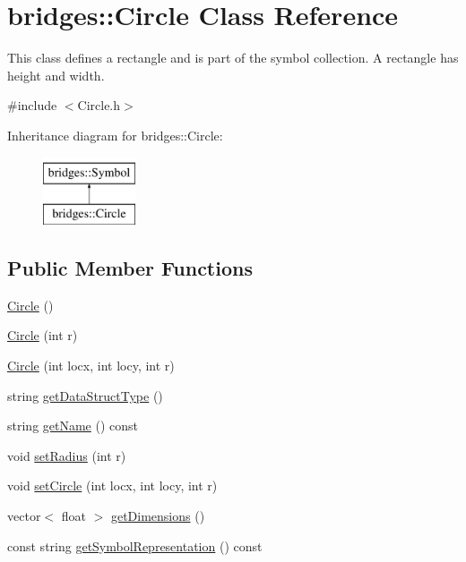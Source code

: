 \hypertarget{classbridges_1_1_circle}{}\section{bridges\+:\+:Circle Class Reference}
\label{classbridges_1_1_circle}


This class defines a rectangle and is part of the symbol collection. A rectangle has height and width.  




{\ttfamily \#include $<$Circle.\+h$>$}

Inheritance diagram for bridges\+:\+:Circle\+:\begin{figure}[H]
\begin{center}
\leavevmode
\includegraphics[height=2.000000cm]{classbridges_1_1_circle}
\end{center}
\end{figure}
\subsection*{Public Member Functions}
\begin{DoxyCompactItemize}
\item 
\hyperlink{classbridges_1_1_circle_a97471b91ab283daf66e257ba982bf404}{Circle} ()
\item 
\hyperlink{classbridges_1_1_circle_a970e38244503f91ca4003acb183763fb}{Circle} (int r)
\item 
\hyperlink{classbridges_1_1_circle_a09b339c2b9f3ee8dfa95d05cb695bb59}{Circle} (int locx, int locy, int r)
\item 
string \hyperlink{classbridges_1_1_circle_a8a6bc6d07c9c49db3967c741b49be44c}{get\+Data\+Struct\+Type} ()
\item 
string \hyperlink{classbridges_1_1_circle_a614ed90e4100977da225dc2ff3abce70}{get\+Name} () const 
\item 
void \hyperlink{classbridges_1_1_circle_a4ddbedd4590cd04692c0be3e760a680c}{set\+Radius} (int r)
\item 
void \hyperlink{classbridges_1_1_circle_a5b3a64ec4e16eb53c7a9415ef435e7ae}{set\+Circle} (int locx, int locy, int r)
\item 
vector$<$ float $>$ \hyperlink{classbridges_1_1_circle_a06e97818128abf9b9caa72aa4d05a704}{get\+Dimensions} ()
\item 
const string \hyperlink{classbridges_1_1_circle_ac7fcb465f018c554dbd90652f2673434}{get\+Symbol\+Representation} () const 
\end{DoxyCompactItemize}
